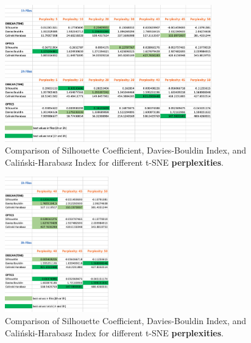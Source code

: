 \begin{figure}
  \centering
  \includegraphics[width=0.8\textwidth]{./images/tsneParametersTest/perplexity/perplexityEvaluationScores.png}
  \caption{Comparison of Silhouette Coefficient, Davies-Bouldin Index, and Caliński-Harabasz Index for different t-SNE \textbf{perplexities}.}
  \label{figure:perplexityEvaluationScores}
\end{figure}

\begin{figure}
  \centering
  \includegraphics[width=0.4\textwidth]{./images/tsneParametersTest/perplexity/perplexityEvaluationScoresDetailed.png}
  \caption{Comparison of Silhouette Coefficient, Davies-Bouldin Index, and Caliński-Harabasz Index for different t-SNE \textbf{perplexities}.}
  \label{figure:perplexityEvaluationScoresDetailed}
\end{figure}


